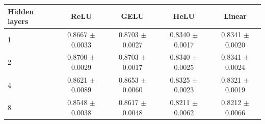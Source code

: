 \begin{tabular}{lcccc}
\toprule
Hidden layers & ReLU & GELU & HeLU & Linear \\
\midrule
1 & 0.8667 $\pm$ 0.0033 & 0.8703 $\pm$ 0.0027 & 0.8340 $\pm$ 0.0017 & 0.8341 $\pm$ 0.0020 \\
2 & 0.8700 $\pm$ 0.0029 & 0.8703 $\pm$ 0.0017 & 0.8340 $\pm$ 0.0025 & 0.8341 $\pm$ 0.0024 \\
4 & 0.8621 $\pm$ 0.0089 & 0.8653 $\pm$ 0.0060 & 0.8325 $\pm$ 0.0023 & 0.8321 $\pm$ 0.0019 \\
8 & 0.8548 $\pm$ 0.0038 & 0.8617 $\pm$ 0.0048 & 0.8211 $\pm$ 0.0062 & 0.8212 $\pm$ 0.0066 \\
\bottomrule
\end{tabular}

